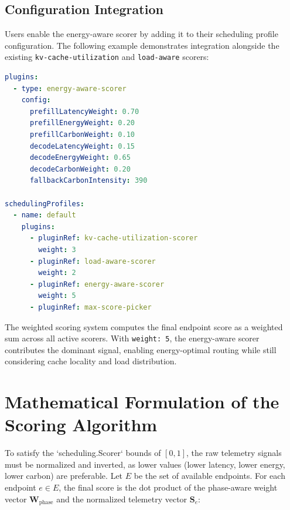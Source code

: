 \subsection{Configuration Integration}
\label{subsec:config-integration}

Users enable the energy-aware scorer by adding it to their scheduling profile configuration. The following example demonstrates integration alongside the existing \texttt{kv-cache-utilization} and \texttt{load-aware} scorers:

\begin{lstlisting}[language=yaml, caption={Example \texttt{EndpointPickerConfig} with energy-aware scoring}, label={lst:epp-config}]
plugins:
  - type: energy-aware-scorer
    config:
      prefillLatencyWeight: 0.70
      prefillEnergyWeight: 0.20
      prefillCarbonWeight: 0.10
      decodeLatencyWeight: 0.15
      decodeEnergyWeight: 0.65
      decodeCarbonWeight: 0.20
      fallbackCarbonIntensity: 390

schedulingProfiles:
  - name: default
    plugins:
      - pluginRef: kv-cache-utilization-scorer
        weight: 3
      - pluginRef: load-aware-scorer
        weight: 2
      - pluginRef: energy-aware-scorer
        weight: 5
      - pluginRef: max-score-picker
\end{lstlisting}

The weighted scoring system computes the final endpoint score as a weighted sum across all active scorers. With \texttt{weight: 5}, the energy-aware scorer contributes the dominant signal, enabling energy-optimal routing while still considering cache locality and load distribution.



\section{Mathematical Formulation of the Scoring Algorithm}
\label{sec:math-formulation}

To satisfy the `scheduling.Scorer` bounds of $[0, 1]$, the raw telemetry signals must be normalized and inverted, as lower values (lower latency, lower energy, lower carbon) are preferable. Let $E$ be the set of available endpoints. For each endpoint $e \in E$, the final score is the dot product of the phase-aware weight vector $\mathbf{W}_{\text{phase}}$ and the normalized telemetry vector $\mathbf{S}_e$:

